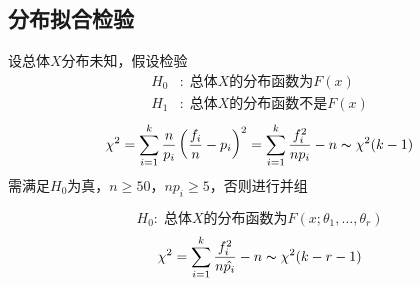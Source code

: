 \subsection{分布拟合检验}
\begin{theorem}[分布拟合检验]
设总体$X$分布未知，假设检验
\[\begin{aligned}
H_0&:\;\text{总体$X$的分布函数为}F(x)\\
H_1&:\;\text{总体$X$的分布函数不是}F(x)
\end{aligned}\]
\[\chi^2=\sum_{i=1}^k\frac{n}{p_i}\left(\frac{f_i}{n}-p_i\right)^2=\sum_{i=1}^k\dfrac{f_i^2}{np_i}-n\thicksim\chi^2(k-1)\]
需满足$H_0$为真，$n\geq 50$，$np_i\geq 5$，否则进行并组
\end{theorem}
\begin{theorem}[分布族的拟合检验]
\[H_0:\;\text{总体$X$的分布函数为}F(x;\theta_1,\ldots,\theta_r)\]
\[\chi^2=\sum_{i=1}^k\dfrac{f_i^2}{n\hat{p_i}}-n\thicksim\chi^2(k-r-1)\]
\end{theorem}